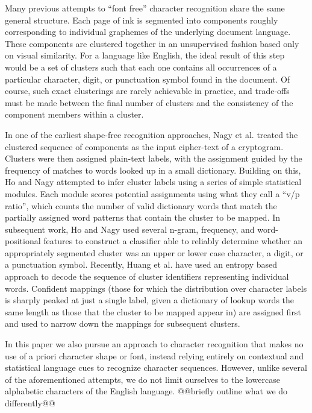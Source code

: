 \documentclass[times, 10pt,twocolumn]{article}
\begin{document}
Many previous attempts to ``font free'' character recognition share
the same general structure. Each page of ink is segmented into components
roughly corresponding to individual graphemes of the 
underlying document language. These components are clustered together in an 
unsupervised fashion based only on visual similarity.  For a language like English, 
the ideal result of this step would be a set of clusters such that
each one contains all occurrences of a particular 
character, digit, or punctuation symbol found in the document.
Of course, such exact clusterings are rarely achievable in practice, and trade-offs must
be made between the final number of clusters and the consistency of the
component members within a cluster.

In one of the earliest shape-free recognition approaches, Nagy et al. treated
the clustered sequence of components as the input cipher-text of a 
cryptogram\cite{nagy1987}.  Clusters were then assigned plain-text labels, 
with the assignment guided by the frequency of matches to words looked up in a small dictionary.
%
%
Building on this, Ho and Nagy attempted to infer cluster labels using a series of simple
statistical modules\cite{ho2000}.  Each module scores potential assignments
using what they call a ``v/p ratio'', which counts the number of valid
dictionary words that match the partially assigned word patterns that contain
the cluster to be mapped.  In subsequent work, Ho and Nagy used 
several n-gram, frequency, and word-positional features to construct a 
classifier able to reliably determine whether an appropriately segmented 
cluster was an upper or lower case character, a digit, or a 
punctuation symbol\cite{ho2001}.
%
Recently, Huang et al. have used an entropy based approach to decode the
sequence of cluster identifiers representing individual words\cite{huang2006}.  
Confident mappings (those for which the distribution over character labels is 
sharply peaked at just a single label, given a dictionary of lookup words the 
same length as those that the cluster to be mapped appear in) are assigned 
first and used to narrow down the mappings for subsequent clusters.

In this paper we also pursue an approach to character recognition that 
makes no use of a priori character shape or font, instead relying entirely on 
contextual and statistical language cues to recognize character sequences.  However, unlike 
several of the aforementioned attempts, we do not limit ourselves to the 
lowercase alphabetic characters of the English language. @@briefly outline 
what we do differently@@
\end{document}
